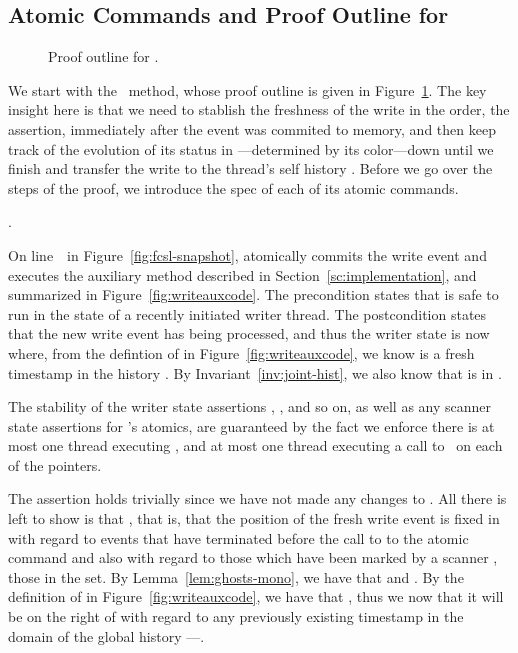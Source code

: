 \subsection{Atomic Commands and Proof Outline for \jywrite}
\label{sc:atoms-write}

\begin{figure}[t]

  \caption{\label{proof:write} Proof outline for .}
\end{figure}
 
We start with the \jywrite\ method, whose proof outline is given in
Figure~\ref{proof:write}. The key insight here is that we need to
stablish the freshness of the write in the order, \ie the  assertion, immediately after the event was
commited to memory, and then keep track of the evolution of its status
in ---determined by its color---down until we finish and
transfer the write to the thread's self history . Before we go
over the steps of the proof, we introduce the spec of each of its
atomic commands.

.





On line~\lineWrtWrt~in Figure~\ref{fig:fcsl-snapshot},
 atomically commits the
write event and executes the  auxiliary method
described in Section~\ref{sc:implementation}, and summarized in
Figure~\ref{fig:writeauxcode}. The precondition states that
 is safe to run in the state of a recently initiated
writer thread. The postcondition states that the new write event has
being processed, and thus the writer state is now 
where, from the defintion of  in
Figure~\ref{fig:writeauxcode}, we know  is a fresh timestamp in the
history . By Invariant~\ref{inv:joint-hist}, we also know
that  is in .



The stability of the writer state assertions , , and so on, as well as any scanner state assertions
for \jyscan's atomics, are guaranteed by the fact we enforce there is
at most one thread executing \jyscan, and at most one thread executing
a call to \jywrite~on each of the pointers.


The assertion  holds trivially since we have not
made any changes to . All there is left to show is that , that is, that the position of the fresh
write event  is fixed in  with regard to events that
have terminated before the call to to the atomic command and also with
regard to those which have been marked by a scanner \ie, those in the
 set. By Lemma~\ref{lem:ghosts-mono}, we have
that  and . By the definition of  in
Figure~\ref{fig:writeauxcode}, we have that , thus we now that it will be on the
right of  with regard to any previously existing timestamp in
the domain of the global history ---\ie .

